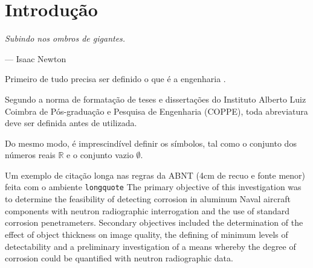 \chapter{Introdução}

\epigraph{\textit{Subindo nos ombros de gigantes.}}{--- Isaac Newton}

Primeiro de tudo precisa ser definido o que é a engenharia .

Segundo a norma de formata{\c c}\~ao de teses e disserta{\c c}\~oes do
Instituto Alberto Luiz Coimbra de P\'os-gradua{\c c}\~ao e Pesquisa de
Engenharia (COPPE), toda abreviatura deve ser definida antes de
utilizada.

Do mesmo modo, \'e imprescind\'ivel definir os s\'imbolos, tal como o
conjunto dos n\'umeros reais $\mathbb{R}$ e o conjunto vazio $\emptyset$.

\begin{longquote}
	
Um exemplo de citação longa nas regras da ABNT (4cm de recuo e fonte menor)
feita com o ambiente  \verb=longquote= The primary objective of this
investigation was to determine the feasibility of detecting corrosion in
aluminum Naval aircraft components with neutron radiographic interrogation
and the use of standard corrosion penetrameters. Secondary objectives
included the determination of the effect of object thickness on image quality,
the defining of minimum levels of detectability and a preliminary investigation
of a means whereby the degree of corrosion could be quantified with neutron
radiographic data. \cite{article-example}
\end{longquote}

